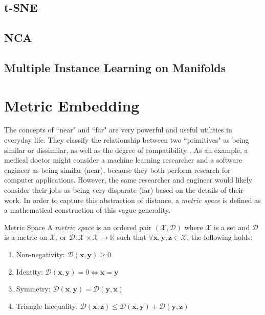 \subsection{t-SNE}

\subsection{NCA}

\subsection{Multiple Instance Learning on Manifolds}

\section{Metric Embedding}

The concepts of ``near" and ``far" are very powerful and useful utilities in everyday life.  They classify the relationship between two ``primitives" as being similar or dissimilar, as well as the degree of compatibility \cite{Thorstensen2009ManifoldThesis}. As an example, a medical doctor might consider a machine learning researcher and a software engineer as being similar (near), because they both perform research for computer applications.  However, the same researcher and engineer would likely consider their jobs as being very disparate (far) based on the details of their work.  In order to capture this abstraction of distance, a \textit{metric space} is defined as a mathematical construction  of this vague generality.

 \theoremstyle{definition}
 \begin{definition}{Metric Space}
 A \textit{metric space} is an ordered pair $(\mathcal{X},\mathcal{D})$ where $\mathcal{X}$ is a set and $\mathcal{D}$ is a metric on $\mathcal{X}$, or $\mathcal{D}:\mathcal{X} \times \mathcal{X} \rightarrow \mathbb{R}$ such that $\forall \bm{x},\bm{y},\bm{z}\in\mathcal{X}$, the following holds:

 \end{definition}
 	\begin{enumerate}
	\item Non-negativity: $\mathcal{D}(\bm{x},\bm{y}) \geq 0$
	\item Identity: $\mathcal{D}(\bm{x},\bm{y}) = 0 \iff \bm{x} = \bm{y} $
	\item Symmetry: $\mathcal{D}(\bm{x},\bm{y}) = \mathcal{D}(\bm{y},\bm{x})$
	\item Triangle Inequality:  $\mathcal{D}(\bm{x},\bm{z}) \leq \mathcal{D}(\bm{x},\bm{y}) + \mathcal{D}(\bm{y},\bm{z})$
	\end{enumerate}


